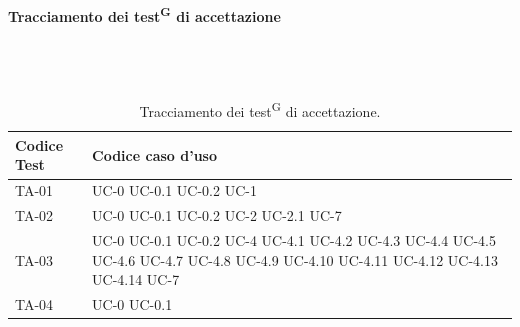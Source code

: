 \documentclass[8pt]{article}
\newcommand{\glossterm}[1]{#1\textsuperscript{G}} %
\newcommand{\subsubsubsection}[1]{\paragraph{#1}\mbox{}\\\\}
\begin{document}
\clearpage
\subsubsubsection{Tracciamento dei \glossterm{test} di accettazione}
\renewcommand{\arraystretch}{2.5}
\begin{longtable}{|>{\centering}p{4cm}|>{\centering\arraybackslash}p{4cm}|}
\hline
\rowcolor{white}
\textbf{Codice Test} & \textbf{Codice caso d'uso} \\
\hline
\endfirsthead
\rowcolor{white}
\caption{Tracciamento dei \glossterm{test} di accettazione.}
\label{table:Tracciamento dei test di accettazione}
\endlastfoot
    TA-01 & UC-0 \newline
            UC-0.1 \newline
            UC-0.2 \newline
            UC-1  
    \\
    \hline
    TA-02 & UC-0 \newline
            UC-0.1 \newline
            UC-0.2 \newline
            UC-2 \newline
            UC-2.1 \newline
            UC-7
    \\
    \hline 
    TA-03 & UC-0 \newline
            UC-0.1 \newline
            UC-0.2 \newline
            UC-4 \newline
            UC-4.1 \newline
            UC-4.2 \newline
            UC-4.3 \newline
            UC-4.4 \newline
            UC-4.5 \newline
            UC-4.6 \newline
            UC-4.7 \newline
            UC-4.8 \newline
            UC-4.9 \newline
            UC-4.10 \newline
            UC-4.11 \newline
            UC-4.12 \newline
            UC-4.13 \newline
            UC-4.14 \newline
            UC-7
    \\
    \hline
    TA-04 & UC-0 \newline
            UC-0.1 \newline

\end{longtable}
\end{document}
